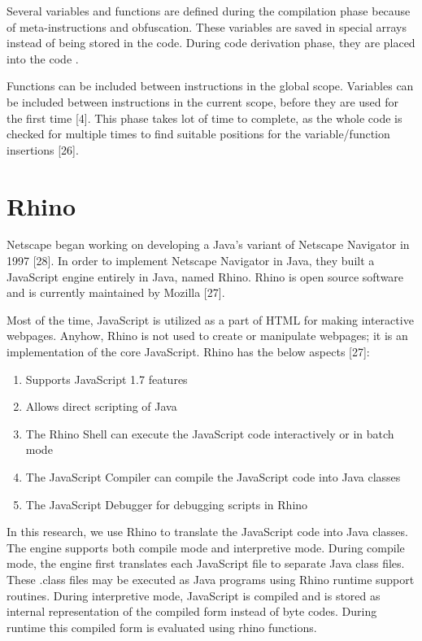 Several variables and functions are defined during the compilation phase because of meta-instructions and obfuscation. These variables are saved in special arrays instead of being stored in the code. During code derivation phase, they are placed into the code .

Functions can be included between instructions in the global scope. Variables can be included between instructions in the current scope, before they are used for the first time [4]. This phase takes lot of time to complete, as the whole code is checked for multiple times to find suitable positions for the variable/function insertions [26].


\section{Rhino}

Netscape began working on developing a Java’s variant of Netscape Navigator in 1997 [28]. In order to implement Netscape Navigator in Java, they built a JavaScript engine entirely in Java, named Rhino. Rhino is open source software and is currently maintained by Mozilla [27].

Most of the time, JavaScript is utilized as a part of HTML for making interactive webpages. Anyhow, Rhino is not used to create or manipulate webpages; it is an implementation of the core JavaScript. Rhino has the below aspects [27]:

\begin{enumerate}
\item Supports JavaScript 1.7 features
\item Allows direct scripting of Java
\item The Rhino Shell can execute the JavaScript code interactively or in batch mode
\item The JavaScript Compiler can compile the JavaScript code into Java classes
\item The JavaScript Debugger for debugging scripts in Rhino
\end{enumerate}
 
In this research, we use Rhino to translate the JavaScript code into Java classes. The engine supports both compile mode and interpretive mode. During compile mode, the engine first translates each JavaScript file to separate Java class files. These .class files may be executed as Java programs using Rhino runtime support routines. During interpretive mode, JavaScript is compiled and is stored as internal representation of the compiled form instead of byte codes. During runtime this compiled form is evaluated using rhino functions.

